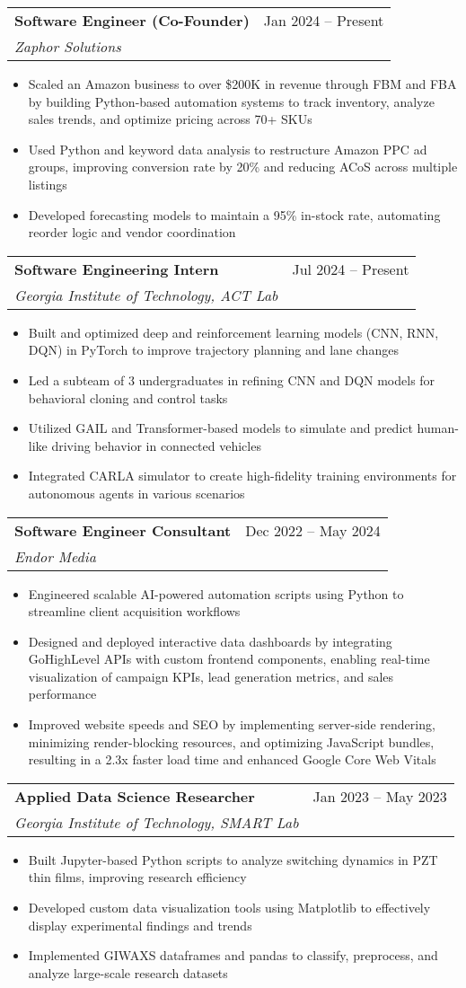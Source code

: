 \documentclass[letterpaper,11pt]{article}
\makeatletter
\newcommand{\resumeItem}[1]{
  \item\small{
    {#1 \vspace{-2pt}}
  }
}
\newcommand{\resumeSubSubSubheading}[3]{
  \vspace{-2pt}\item
    \begin{tabular*}{0.97\textwidth}[t]{l@{\extracolsep{\fill}}r}
      \textbf{#1} & #2 \\
      \textit{\small#3} \\
    \end{tabular*}\vspace{-7pt}
}
\newcommand{\resumeItemListStart}{\begin{itemize}}
\newcommand{\resumeItemListEnd}{\end{itemize}\vspace{-5pt}}
\makeatother
\begin{document}
\resumeSubSubSubheading
{Software Engineer (Co-Founder)}{Jan 2024 -- Present}
{Zaphor Solutions}
\resumeItemListStart
\resumeItem{Scaled an Amazon business to over \$200K in revenue through FBM and FBA by building Python-based automation systems to track inventory, analyze sales trends, and optimize pricing across 70+ SKUs}
\resumeItem{Used Python and keyword data analysis to restructure Amazon PPC ad groups, improving conversion rate by 20\% and reducing ACoS across multiple listings}
\resumeItem{Developed forecasting models to maintain a 95\% in-stock rate, automating reorder logic and vendor coordination}
\resumeItemListEnd

\resumeSubSubSubheading
{Software Engineering Intern}{Jul 2024 -- Present}
{Georgia Institute of Technology, ACT Lab}
\resumeItemListStart
\resumeItem{Built and optimized deep and reinforcement learning models (CNN, RNN, DQN) in PyTorch to improve trajectory planning and lane changes}
\resumeItem{Led a subteam of 3 undergraduates in refining CNN and DQN models for behavioral cloning and control tasks}
\resumeItem{Utilized GAIL and Transformer-based models to simulate and predict human-like driving behavior in connected vehicles}
\resumeItem{Integrated CARLA simulator to create high-fidelity training environments for autonomous agents in various scenarios}
\resumeItemListEnd

\resumeSubSubSubheading
{Software Engineer Consultant}{Dec 2022 -- May 2024}
{Endor Media}
\resumeItemListStart
\resumeItem{Engineered scalable AI-powered automation scripts using Python to streamline client acquisition workflows}
\resumeItem{Designed and deployed interactive data dashboards by integrating GoHighLevel APIs with custom frontend components, enabling real-time visualization of campaign KPIs, lead generation metrics, and sales performance}
\resumeItem{Improved website speeds and SEO by implementing server-side rendering, minimizing render-blocking resources, and optimizing JavaScript bundles, resulting in a 2.3x faster load time and enhanced Google Core Web Vitals}
\resumeItemListEnd


\resumeSubSubSubheading
{Applied Data Science Researcher}{Jan 2023 -- May 2023}
{Georgia Institute of Technology, SMART Lab}
\resumeItemListStart
\resumeItem{Built Jupyter-based Python scripts to analyze switching dynamics in PZT thin films, improving research efficiency}
\resumeItem{Developed custom data visualization tools using Matplotlib to effectively display experimental findings and trends }
\resumeItem{Implemented GIWAXS dataframes and pandas to classify, preprocess, and analyze large-scale research datasets}
\resumeItemListEnd
\end{document}
